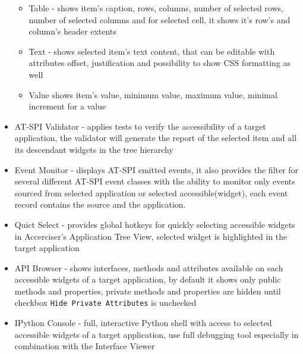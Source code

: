 \begin{itemize}
\begin{itemize}
        \item Table - shows item's caption, rows, columns, number of selected rows, number of selected columns and for selected cell, it shows  it's row's and column's header extents  
        \item Text - shows selected item's text content, that can be editable with attributes offset, justification  and possibility to show CSS formatting as well
        \item Value shows item's value, minimum value, maximum value, minimal increment for a value 
    \end{itemize}
    \item AT-SPI Validator - applies tests to verify the accessibility of a target application, the validator will generate the report of the selected item and all its descendant widgets in the tree hierarchy
    \item Event Monitor - displays AT-SPI emitted events, it also provides the filter for several different AT-SPI event classes with the ability to monitor only events sourced from selected application or selected accessible(widget), each event record contains the source and the application.
    \item Quict Select - provides global hotkeys for quickly selecting accessible widgets in Accerciser's Application Tree View, selected widget is highlighted in the target application
    \item API Browser - shows interfaces, methods and attributes available on each accessible widgets of a target application, by default it shows only public methods and properties, private methods and properties are hidden until checkbox \texttt{Hide Private Attributes} is unchecked
    \item IPython Console - full, interactive Python shell with access to selected accessible widgets of a target application, use full debugging tool especially in combination with the Interface Viewer
\end{itemize}

